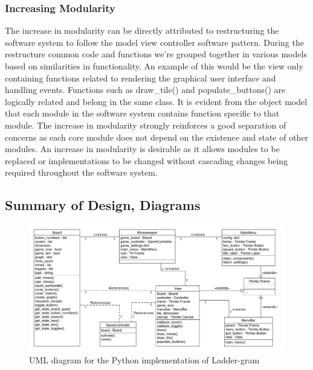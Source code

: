 \documentclass[12pt, a4]{report}
\begin{document}
\subsubsection{Increasing Modularity}
The increase in modularity can be directly attributed to restructuring the software system to follow the model view controller software pattern. During the restructure common code and functions we're grouped together in various models based on similarities in functionality. An example of this would be the view only containing functions related to rendering the graphical user interface and handling events. Functions such as draw\_tile() and populate\_buttons() are logically related and belong in the same class. It is evident from the object model that each module in the software system contains function specific to that module. The increase in modularity strongly reinforces a good separation of concerns as each core module does not depend on the existence and state of other modules. An increase in modularity is desirable as it allows modules to be replaced or implementations to be changed without cascading changes being required throughout the software system.

\subsection{Summary of Design, Diagrams}
\begin{figure}[!h]
	\centering
	\includegraphics[scale=0.5]{ClassDiagram}
	\caption{UML diagram for the Python implementation of Ladder-gram}
\end{figure}
\par 
\end{document}
